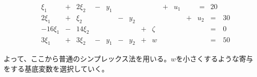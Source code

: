 \documentclass[dvipdfmx,titlepage, a4paper]{jsarticle}%
\begin{document}
\begin{eqnarray*}
	&&\begin{array}{cccccccccccccccc}
		\xi_{1} & + & 2\xi_{2} & - & y_{1} & \; & \; & \; & \; & + & u_{1} & \; & \; = & 20\\ 
		2\xi_{1} & + & \xi_{2} & \; & \; & - & y_{2} & \; & \; & \; & \; & + & u_{2} & = & 30\\ 
		-16\xi_{1} & - & 14\xi_{2} & \; & \; & \; & \; & + & \zeta & \; & \; & \; & \; & = & 0\\ 
		3\xi_{1} & + & 3\xi_{2} & - & y_{1} & - & y_{2} & + & w & \; & \; & \; & \; & = & 50\\ 
	\end{array}\\
\end{eqnarray*}
よって、ここから普通のシンプレックス法を用いる。$w$を小さくするような寄与をする基底変数を選択していく。
\end{document}
